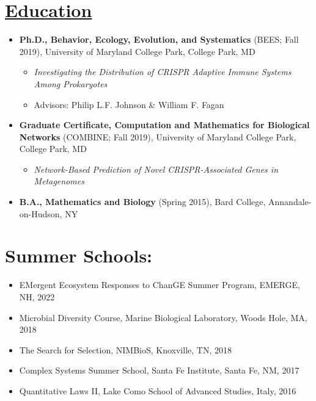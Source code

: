 \documentclass[]{res}
\begin{document}
\begin{resume}
\begin{itemize}[leftmargin=*]
\section{\underline{Education}} %

\begin{itemize}[leftmargin=*]
\setlength\itemsep{0.5em}
\item[] {\bf Ph.D., Behavior, Ecology, Evolution, and Systematics} (BEES; Fall 2019),
University of Maryland College Park, College Park, MD
\begin{itemize}
\item[] \emph{Investigating the Distribution of CRISPR Adaptive Immune Systems Among Prokaryotes}
\item[] Advisors: Philip L.F. Johnson \& William F. Fagan
\end{itemize}

\item[] {\bf Graduate Certificate, Computation and Mathematics for Biological Networks} (COMBINE; Fall 2019),
University of Maryland College Park, College Park, MD
\begin{itemize}
\item[] \emph{Network-Based Prediction of Novel CRISPR-Associated Genes in Metagenomes}
\end{itemize}

\item[]  {\bf B.A., Mathematics and Biology}  (Spring 2015), Bard College, Annandale-on-Hudson, NY
\end{itemize}

 
\section{{Summer Schools:}}%
\begin{itemize}[leftmargin=*]
\item[] {EMergent Ecosystem Responses to ChanGE Summer Program}, EMERGE, NH, 2022
\item[] {Microbial Diversity Course}, Marine Biological Laboratory, Woods Hole, MA, 2018
\item[] {The Search for Selection}, NIMBioS, Knoxville, TN, 2018
\item[] {Complex Systems Summer School}, Santa Fe Institute, Santa Fe, NM, 2017
\item[] {Quantitative Laws II}, Lake Como School of Advanced Studies, Italy, 2016  
 \end{itemize}
 

\end{itemize}
\end{resume}
\end{document}
